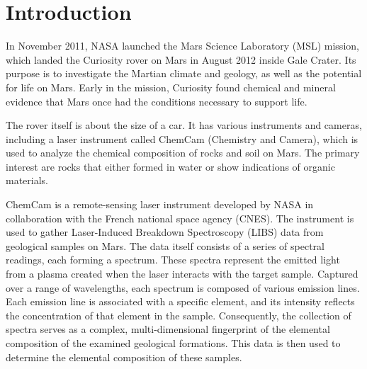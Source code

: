 \section{Introduction}\label{sec:introduction}
In November 2011, NASA launched the Mars Science Laboratory (MSL) mission, which landed the Curiosity rover on Mars in August 2012 inside Gale Crater. Its purpose is to investigate the Martian climate and geology, as well as the potential for life on Mars.
Early in the mission, Curiosity found chemical and mineral evidence that Mars once had the conditions necessary to support life.\cite{chemcam_nasa_website}

The rover itself is about the size of a car.
It has various instruments and cameras, including a laser instrument called ChemCam (Chemistry and Camera), which is used to analyze the chemical composition of rocks and soil on Mars.
The primary interest are rocks that either formed in water or show indications of organic materials.\cite{chemcam_nasa_website}

ChemCam is a remote-sensing laser instrument developed by NASA in collaboration with the French national space agency (CNES).
The instrument is used to gather Laser-Induced Breakdown Spectroscopy (LIBS) data from geological samples on Mars. The data itself consists of a series of spectral readings, each forming a spectrum. These spectra represent the emitted light from a plasma created when the laser interacts with the target sample. Captured over a range of wavelengths, each spectrum is composed of various emission lines. Each emission line is associated with a specific element, and its intensity reflects the concentration of that element in the sample. Consequently, the collection of spectra serves as a complex, multi-dimensional fingerprint of the elemental composition of the examined geological formations.
This data is then used to determine the elemental composition of these samples.\cite{cleggRecalibrationMarsScience2017}

% 

